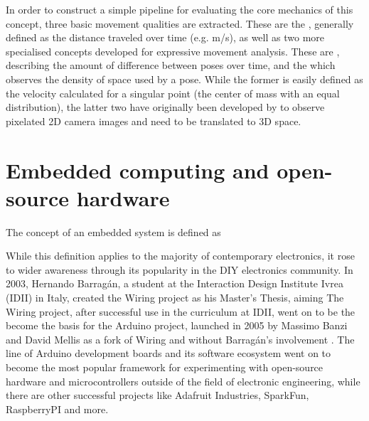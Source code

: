 In order to construct a simple pipeline for evaluating the core mechanics of this concept, three basic movement qualities are extracted. These are the , generally defined as the distance traveled over time (e.g. m/s), as well as two more specialised concepts developed for expressive movement analysis. These are  \parencite[96-97]{movementQualities}, describing the amount of difference between poses over time, and the  \parencite[97]{movementQualities} which observes the density of space used by a pose. While the former is easily defined as the velocity calculated for a singular point (the center of mass with an equal distribution), the latter two have originally been developed by to observe pixelated \ac{2D} camera images and need to be translated to \ac{3D} space.


\section{Embedded computing and open-source hardware}
\label{section:embeddedComputing}

The concept of an embedded system is defined as 

While this definition applies to the majority of contemporary electronics, it rose to wider awareness through its popularity in the \ac{DIY} electronics community. In 2003, Hernando Barragán, a student at the Interaction Design Institute Ivrea (IDII) in Italy, created the Wiring project as his Master's Thesis, aiming  The Wiring project, after successful use in the curriculum at IDII, went on to be the become the basis for the Arduino project, launched in 2005 by Massimo Banzi and David Mellis as a fork of Wiring and without Barragán's involvement \parencite{arduinoHistory}. The line of Arduino development boards and its software ecosystem went on to become the most popular framework for experimenting with open-source hardware and microcontrollers outside of the field of electronic engineering, while there are other successful projects like Adafruit Industries, SparkFun, RaspberryPI and more.


